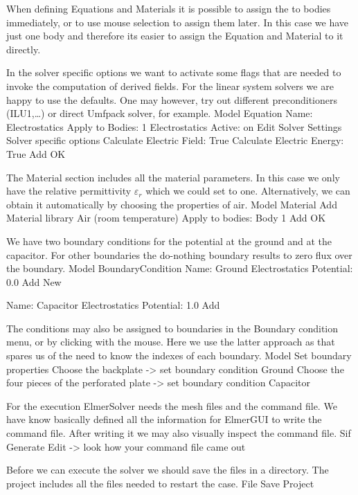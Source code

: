 When defining Equations and Materials it is possible to assign the to bodies immediately, or to use mouse
selection to assign them later. In this case we have just one body and therefore its easier to assign 
the Equation and Material to it directly.

In the solver specific options we want to activate some flags that are needed to invoke the 
computation of derived fields. 
For the linear system solvers we are happy to use the defaults. One may however, try out different
preconditioners (ILU1,\ldots) or direct Umfpack solver, for example.
\ttbegin
Model
  Equation
    Name: Electrostatics
    Apply to Bodies: 1
    Electrostatics
      Active: on
      Edit Solver Settings
        Solver specific options
          Calculate Electric Field:     True
          Calculate Electric Energy:    True
    Add 
    OK
\ttend        

The Material section includes all the material parameters.
In this case we only have the relative permittivity $\varepsilon_r$ which we could set to one.
Alternatively, we can obtain it automatically by choosing the properties of air. 
\ttbegin
Model
  Material
    Add 
      Material library
        Air (room temperature)
      Apply to bodies: Body 1 
      Add 
      OK
\ttend


We have two boundary conditions for the potential at the ground and at the capacitor. For other boundaries
the do-nothing boundary results to zero flux over the boundary.
\ttbegin
Model
  BoundaryCondition
    Name: Ground
    Electrostatics
      Potential: 0.0
    Add
    New

    Name: Capacitor
    Electrostatics
      Potential: 1.0
    Add
\ttend   

The conditions may also be assigned to boundaries in the Boundary condition menu, or 
by clicking with the mouse. Here we use the latter approach as that spares us of the 
need to know the indexes of each boundary.
\ttbegin
Model
  Set boundary properties
    Choose the backplate -> set boundary condition Ground
    Choose the four pieces of the perforated plate -> set boundary condition Capacitor
\ttend

For the execution 
ElmerSolver needs the mesh files and the command file. We have know basically defined
all the information for ElmerGUI to write the command file. After writing it we may also visually 
inspect the command file.
\ttbegin
Sif 
  Generate
  Edit -> look how your command file came out  
\ttend

Before we can execute the solver we should save the files in a directory. The project includes
all the files needed to restart the case.
\ttbegin
File 
  Save Project
\ttend

